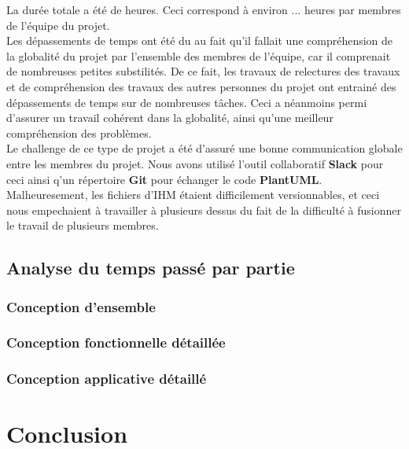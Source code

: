 La durée totale a été de  heures. Ceci correspond à environ ... heures par membres de l'équipe du projet.\\

Les dépassements de temps ont été du au fait qu'il fallait une compréhension de la globalité du projet par l'ensemble des membres de l'équipe, car il comprenait de nombreuses petites substilités. De ce fait, les travaux de relectures des travaux et de compréhension des travaux des autres personnes du projet ont entrainé des dépassements de temps sur de nombreuses tâches. Ceci a néanmoins permi d'assurer un travail cohérent dans la globalité, ainsi qu'une meilleur compréhension des problèmes.\\

Le challenge de ce type de projet a été d'assuré une bonne communication globale entre les membres du projet. Nous avons utilisé l'outil collaboratif \textbf{Slack} pour ceci ainsi q'un répertoire \textbf{Git} pour échanger le code \textbf{PlantUML}. Malheuresement, les fichiers d'IHM étaient difficilement versionnables, et ceci nous empechaient à travailler à plusieurs dessus du fait de la difficulté à fusionner le travail de plusieurs membres.

\subsection{Analyse du temps passé par partie}
\subsubsection{Conception d'ensemble}
\subsubsection{Conception fonctionnelle détaillée}
\subsubsection{Conception applicative détaillé}



\section{Conclusion}